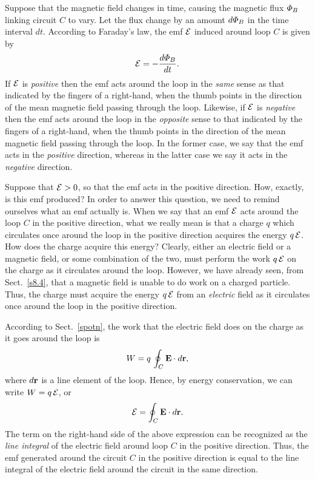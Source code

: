 Suppose that the magnetic field   changes in time,   causing the
magnetic flux ${\mit\Phi}_B$ linking circuit $C$ to vary.
Let the flux change by an amount $d{\mit\Phi}_B$ in the time interval $dt$. According to Faraday's law, the emf
${\cal E}$
induced around loop $C$ is given by
\begin{equation}\label{ex}
{\cal E} = - \frac{d{\mit\Phi}_B}{dt}.
\end{equation}
If ${\cal E}$ is
{\em positive}\/ then the emf acts around the loop in the {\em same}\/ sense as that
indicated
by the fingers of a right-hand, when the thumb points
in the  direction of the mean  magnetic field passing through the loop. Likewise,
if ${\cal E}$ is
{\em negative}\/  then the emf acts around the loop in the 
{\em opposite}\/ sense to that
indicated
by the fingers of a right-hand, when the thumb  points
in the  direction of the mean magnetic field passing through the loop. In the
former case, we say that the emf acts in the {\em positive}\/ direction, whereas
in the latter case we say it acts in the {\em negative}\/ direction.

Suppose that ${\cal E}>0$, so that the emf acts in the positive direction.
How, exactly, is this emf produced? In order to answer this question,
we need to remind ourselves what an emf actually is. When we say that
an emf ${\cal E}$ acts around the loop $C$ in the positive direction,
what we really mean is that a charge $q$ which circulates once around
the loop in the positive direction acquires the energy $q\,{\cal E}$.
How does the charge acquire this energy? Clearly, either an electric
field or a magnetic field, or some combination of the two, must perform the
work $q\,{\cal E}$ on the charge as it circulates around the loop.
However, we have already seen, from Sect.~\ref{s8.4}, that a magnetic
field is unable to do work on a charged particle. Thus, the charge must
acquire the energy $q\,{\cal E}$ from an {\em electric}\/ field as it
circulates once around the loop in the positive direction.

According to Sect.~\ref{spotn}, the work that the electric field does on the charge as it goes around
the loop is
\begin{equation}
W=q\,\oint_C {\bf E}\cdot d{\bf r},
\end{equation}
where $d{\bf r}$ is a line element of the loop. Hence, by energy conservation,
we can write $W = q\,{\cal E}$, or
\begin{equation}\label{ey}
{\cal E} = \oint_C {\bf E} \cdot d{\bf r}.
\end{equation}
 The term
on the right-hand side of the above expression can be recognized as
the {\em line integral}\/ of the electric field around loop $C$ in the
positive direction. Thus, the emf generated around the
circuit $C$ in the positive direction is equal to the line integral
of the electric field around the circuit in the same direction. 

